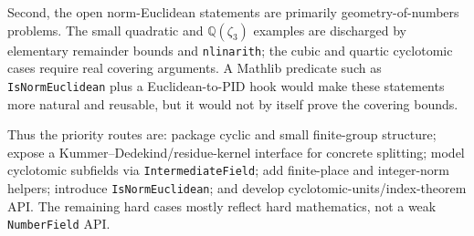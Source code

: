 \documentclass[UTF8,a4paper,11pt,fontset=fandol]{ctexart}
\theoremstyle{definition}
\begin{document}
Second, the open norm-Euclidean statements are primarily geometry-of-numbers problems.  The small
quadratic and \(\mathbb Q(\zeta_3)\) examples are discharged by elementary remainder bounds and
\texttt{nlinarith}; the cubic and quartic cyclotomic cases require real covering arguments.  A
Mathlib predicate such as \texttt{IsNormEuclidean} plus a Euclidean-to-PID hook would make these
statements more natural and reusable, but it would not by itself prove the covering bounds.

{\raggedright
Thus the priority routes are: package cyclic and small finite-group structure; expose a
Kummer--Dedekind/residue-kernel interface for concrete splitting; model cyclotomic subfields via
\texttt{IntermediateField}; add finite-place and integer-norm helpers; introduce
\texttt{IsNormEuclidean}; and develop cyclotomic-units/index-theorem API.  The remaining hard cases
mostly reflect hard mathematics, not a weak \texttt{NumberField} API.
\par}
\end{document}
